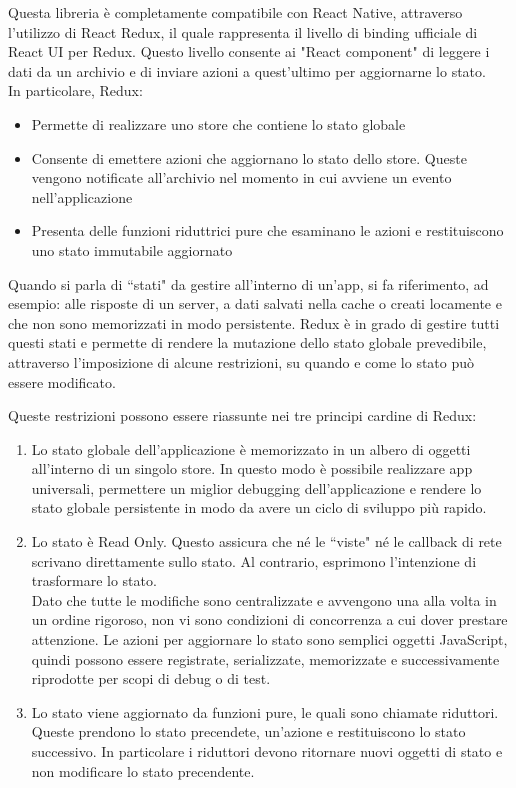Questa libreria \`e completamente compatibile con React Native, attraverso l'utilizzo di React Redux, il quale rappresenta il livello di binding ufficiale di React UI per Redux.
Questo livello consente ai "React component" di leggere i dati da un archivio e di inviare azioni a quest'ultimo per aggiornarne lo stato.\\
In particolare, Redux:
\begin{itemize}
      \item Permette di realizzare uno store che contiene lo stato globale
      \item Consente di emettere azioni che aggiornano lo stato dello store. Queste vengono notificate all'archivio nel momento in cui avviene un evento nell'applicazione
      \item Presenta delle funzioni riduttrici pure che esaminano le azioni e restituiscono uno stato immutabile aggiornato
\end{itemize}
Quando si parla di ``stati" da gestire all'interno di un'app, si fa riferimento, ad esempio: alle risposte di un server, a dati salvati nella
cache o creati locamente e che non sono memorizzati in modo persistente. Redux \`e in grado di gestire tutti questi stati e permette di rendere la mutazione
dello stato globale prevedibile, attraverso l'imposizione di alcune restrizioni, su quando e come lo stato pu\`o essere modificato.

Queste restrizioni possono essere riassunte nei tre principi cardine di Redux\cite{Redux}:

\begin{enumerate}
      \item Lo stato globale dell'applicazione \`e memorizzato in un albero di oggetti all'interno di un singolo store. In questo modo \`e possibile realizzare app universali, permettere un miglior debugging dell'applicazione e
            rendere lo stato globale persistente in modo da avere un ciclo di sviluppo pi\`u rapido.
      \item Lo stato \`e Read Only. Questo assicura che n\'e le ``viste" n\'e le callback di rete scrivano direttamente sullo stato. Al contrario, esprimono l'intenzione di trasformare lo stato.
            \\Dato che tutte le modifiche sono centralizzate e avvengono una alla volta in un ordine rigoroso, non vi sono condizioni di concorrenza a cui dover prestare attenzione.
            Le azioni per aggiornare lo stato sono semplici oggetti JavaScript, quindi possono essere registrate, serializzate, memorizzate e successivamente riprodotte per scopi
            di debug o di test.
      \item Lo stato viene aggiornato da funzioni pure, le quali sono chiamate riduttori. Queste prendono lo stato precendete, un'azione e restituiscono lo stato successivo.
            In particolare i riduttori devono ritornare nuovi oggetti di stato e non modificare lo stato precendente.

\end{enumerate}

